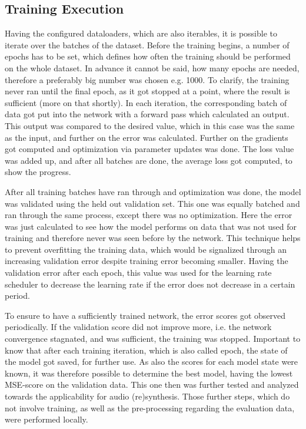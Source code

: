 \subsection{Training Execution}
Having the configured dataloaders, which are also iterables, it is possible to iterate over the batches of the dataset. Before the training begins, a number of epochs has to be set, which defines how often the training should be performed on the whole dataset. In advance it cannot be said, how many epochs are needed, therefore a preferably big number was chosen e.g. 1000. To clarify, the training never ran until the final epoch, as it got stopped at a point, where the result is sufficient (more on that shortly). In each iteration, the corresponding batch of data got put into the network with a forward pass which calculated an output. This output was compared to the desired value, which in this case was the same as the input, and further on the error was calculated. Further on the gradients got computed and optimization via parameter updates was done. The loss value was added up, and after all batches are done, the average loss got computed, to show the progress. 

After all training batches have ran through and optimization was done, the model was validated using the held out validation set. This one was equally batched and ran through the same process, except there was no optimization. Here the error was just calculated to see how the model performs on data that was not used for training and therefore never was seen before by the network. This technique helps to prevent overfitting the training data, which would be signalized through an increasing validation error despite training error becoming smaller. Having the validation error after each epoch, this value was used for the learning rate scheduler to decrease the learning rate if the error does not decrease in a certain period. 

To ensure to have a sufficiently trained network, the error scores got observed periodically. If the validation score did not improve more, i.e. the network convergence stagnated, and was sufficient, the training was stopped. Important to know that after each training iteration, which is also called epoch, the state of the model got saved, for further use. As also the scores for each model state were known, it was therefore possible to determine the best model, having the lowest MSE-score on the validation data. This one then was further tested and analyzed towards the applicability for audio (re)synthesis. Those further steps, which do not involve training, as well as the pre-processing regarding the evaluation data, were performed locally. 

